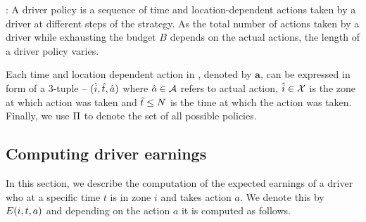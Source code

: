 
:
A driver policy is a sequence of time and location-dependent actions taken by a driver at different steps of the strategy. As the total number of actions taken by a driver while exhausting the budget $B$ depends on the actual actions, the length
of a driver policy {\policy} varies. 

Each time and location dependent action in {\policy}, denoted by $\mathbf{a}$, can be expressed in form of a 3-tuple -- $(\hat{i}, \hat{t}, \hat{a})$
where $\hat{a} \in \mathcal{A}$ refers to actual action, $\hat{i} \in \mathcal{X}$ is the zone at which action was taken and $\hat{t} \leq N$ is the 
time at which the action was taken.
Finally, we use $\Pi$ to denote the set of all possible policies.




\subsection{Computing driver earnings}
In this section, we describe the computation of the expected earnings of a driver
who at a specific time $t$ is in zone $i$ and takes action $a$. We denote this by 
$E({i},{t},{a})$ and depending on the action $a$ it is computed as follows.

